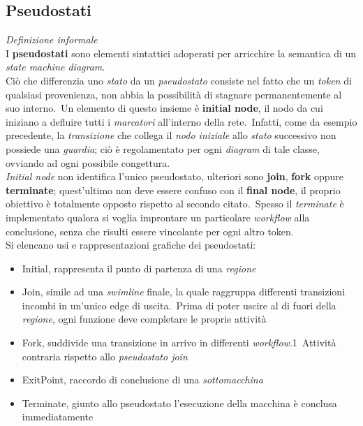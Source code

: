 \documentclass{article}
\begin{document}
\subsection*{Pseudostati}
\large
\textit{Definizione informale}\\I \textbf{pseudostati} sono elementi sintattici adoperati per arricchire la semantica di un \textit{state machine diagram}.\vspace*{14pt}\\
Ciò che differenzia uno \textit{stato} da un \textit{pseudostato} consiste nel fatto che un \textit{token} di qualsiasi provenienza, non abbia la possibilità di stagnare permanentemente al suo interno.\ Un elemento di questo insieme è \textbf{initial node}, il nodo da cui iniziano a defluire tutti i \textit{marcatori} all'interno della rete.\ Infatti, come da esempio precedente, la \textit{transizione} che collega il \textit{nodo iniziale} allo \textit{stato} successivo non possiede una \textit{guardia}; ciò è regolamentato per ogni \textit{diagram} di tale classe, ovviando ad ogni possibile congettura.\vspace*{14pt}\\
\textit{Initial node} non identifica l'unico pseudostato, ulteriori sono \textbf{join}, \textbf{fork} oppure \textbf{terminate}; quest'ultimo non deve essere confuso con il \textbf{final node}, il proprio obiettivo è totalmente opposto rispetto al secondo citato.\ Spesso il \textit{terminate} è implementato qualora si voglia improntare un particolare \textit{workflow} alla conclusione, senza che risulti essere vincolante per ogni altro token.\vspace*{14pt}\\
Si elencano usi e rappresentazioni grafiche dei pseudostati:
\begin{itemize}[label={-}]
    \itemsep0em
    \item Initial, rappresenta il punto di partenza di una \textit{regione}
    \item Join, simile ad una \textit{swimline} finale, la quale raggruppa differenti transizioni incombi in un'unico edge di uscita.\ Prima di poter uscire al di fuori della \textit{regione}, ogni funzione deve completare le proprie attività
    \item Fork, suddivide una transizione in arrivo in differenti \textit{workflow}.1\ Attività contraria rispetto allo \textit{pseudostato join}
    \item ExitPoint, raccordo di conclusione di una \textit{sottomacchina}
    \item Terminate, giunto allo pseudostato l'esecuzione della macchina è conclusa immediatamente
\end{itemize}
\end{document}
